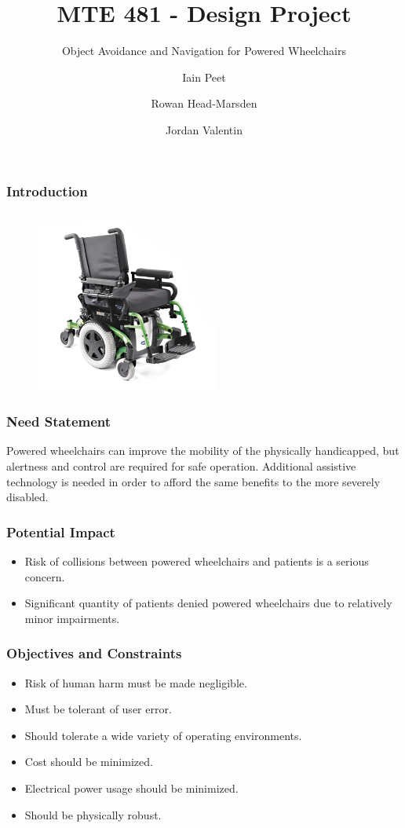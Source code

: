 \documentclass{beamer}
\title{MTE 481 - Design Project}
\subtitle{Object Avoidance and Navigation for Powered Wheelchairs}
\author{Iain Peet \and Rowan Head-Marsden \and Jordan Valentin}
\begin{document}
\begin{frame}
  \titlepage
\end{frame}

\begin{frame}
  \frametitle{Introduction}
  \begin{figure}
    \centering
    \includegraphics[width=6cm]{wheelchair.jpg} 
  \end{figure}
\end{frame}

\begin{frame}
  \frametitle{Need Statement}
  Powered wheelchairs can improve the mobility of the physically handicapped, but 
  alertness and control are required for safe operation.
  Additional assistive technology is needed in order to afford the same benefits
  to the more severely disabled.
\end{frame}

\begin{frame}
  \frametitle{Potential Impact}
  \begin{itemize}
    \item Risk of collisions between powered wheelchairs and patients is a serious concern. \\
    \item Significant quantity of patients denied powered wheelchairs due to relatively minor impairments. \\
  \end{itemize}
\end{frame}

\begin{frame}
  \frametitle{Objectives and Constraints}
  \begin{itemize}
    \item Risk of human harm must be made negligible. \\
    \item Must be tolerant of user error. \\
    \item Should tolerate a wide variety of operating environments. \\
    \item Cost should be minimized. \\
    \item Electrical power usage should be minimized. \\
    \item Should be physically robust. \\
  \end{itemize}
\end{frame}
\end{document}
